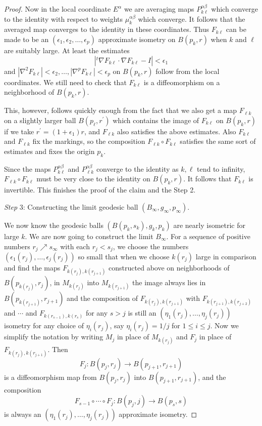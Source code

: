 \begin{proof}
Now in the local coordinate $E^\alpha$ we are averaging maps
$P^{\alpha \beta}_{k \ell}$ which converge to the identity with
respect to weights $\mu^{\alpha \beta}_k$ which converge. It
follows that the averaged map converges to the identity in these
coordinates. Thus $F_{k \ell}$ can be made to be an $(\epsilon_1,
\epsilon_2, \ldots, \epsilon_p)$ approximate isometry on
$B(p_k,r)$ when $k$ and $\ell$ are suitably large. At least the
estimates
$$
|^t\nabla F_{k \ell} \cdot \nabla F_{k\ell}-I| < \epsilon_1
$$
and $|\nabla^2F_{k \ell}| < \epsilon_2, \ldots, |\nabla^pF_{k
\ell}| < \epsilon_p$ on $B(p_k,r)$ follow from the local
coordinates. We still need to check that $F_{k \ell}$ is a
diffeomorphism on a neighborhood of $B(p_k,r)$.

This, however, follows quickly enough from the fact that we also
get a map $F_{\ell k}$ on a slightly larger ball $B(p_\ell,
r^\prime)$ which contains the image of $F_{k \ell}$ on $B(p_k,r)$
if we take $r^\prime=(1+ \epsilon_1)r$, and $F_{\ell k}$ also
satisfies the above estimates. Also $F_{k \ell}$ and $F_{\ell k}$
fix the markings, so the composition $F_{\ell k} \circ F_{k \ell}$
satisfies the same sort of estimates and fixes the origin $p_k$.

Since the maps $P^{\alpha \beta}_{k \ell}$  and $P^{\alpha
\beta}_{\ell k}$ converge to the identity as $k, \ell$ tend to
infinity, $F_{\ell k} \circ F_{k \ell}$ must be very close to the
identity on $B(p_k,r)$. It follows that $F_{k \ell}$ is
invertible.  This finishes the proof of the claim and the Step 2.

\medskip
{\it Step} 3: Constructing the limit geodesic ball $(B_{\infty},
g_{\infty}, p_{\infty})$.

\smallskip
We now know the geodesic balls $(B(p_k,s_k),g_k,p_k)$ are nearly
isometric for large $k$. We are now going to construct the limit
$B_{\infty}$.  For a sequence of positive numbers $r_j \nearrow
s_{\infty}$ with each $r_j < s_j$, we choose the numbers
$(\epsilon_1(r_j), \ldots, \epsilon_j(r_j))$ so small that when we
choose $k(r_j)$ large in comparison and find the maps
$F_{k(r_j),k(r_{j+1})}$ constructed above on neighborhoods of
$B(p_{k(r_j)},r_j)$, in $M_{k(r_j)}$ into $M_{k(r_{j+1})}$ the
image always lies in $B(p_{k(r_{j+1})}, r_{j+1})$ and the
composition of $F_{k(r_j),k(r_{j+1})}$ with
$F_{k(r_{j+1}),k(r_{j+2})}$ and $\cdots$ and
$F_{k(r_{s-1}),k(r_s)}$ for any $s> j$ is still an $(\eta_1(r_j),
\ldots, \eta_j(r_j))$ isometry for any choice of $\eta_i(r_j)$,
say $\eta_i(r_j)=1/j$ for $1 \leq i \leq j$.  Now we simplify the
notation by writing $M_j$ in place of $M_{k(r_j)}$ and $F_j$ in
place of $F_{k(r_j),k(r_{j+1})}$. Then
$$
F_j:B(p_j,r_j) \rightarrow B(p_{j+1}, r_{j+1})
$$
is a diffeomorphism map from $B(p_j,r_j)$ into $B(p_{j+1},
r_{j+1})$, and the composition
$$
F_{s-1} \circ \cdots \circ F_j: B(p_j,j) \rightarrow B(p_s,s)
$$
is always an $(\eta_1(r_j), \ldots, \eta_j(r_j))$ approximate
isometry.


\end{proof}

